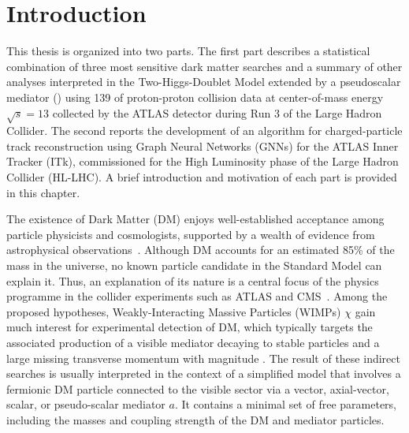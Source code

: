  \chapter{Introduction}

This thesis is organized into two parts.
The first part describes a statistical combination of three most sensitive dark matter searches and a summary of other analyses interpreted in the Two-Higgs-Doublet
Model extended by a pseudoscalar mediator (\thdma) using 139 \ifb of 
proton-proton collision data at center-of-mass energy $\sqrt{s}=13$ \TeV collected by the ATLAS detector during Run 3 of the 
Large Hadron Collider. 
The second reports the development of an algorithm for charged-particle track reconstruction using Graph Neural Networks (GNNs) for the ATLAS 
Inner Tracker (ITk), commissioned for the High Luminosity phase of the Large Hadron Collider (HL-LHC).
A brief introduction and motivation of each part is provided in this chapter.

The existence of Dark Matter (DM) enjoys well-established acceptance among particle physicists and cosmologists, supported by a 
wealth of evidence from astrophysical observations~\cite{Corbelli:1999af,Rubin:1980,Begemann:1991,Hinshaw:2012aka,Akrami:2018vks,Trimble1987,Bertone2005,Feng2010}. 
Although DM accounts for an estimated 85\% of the mass in the universe, no known particle candidate in the Standard Model can explain it.
Thus, an explanation of its nature is a central focus of the physics programme in the collider experiments such as ATLAS and CMS~\cite{adan2023darkmattersearchescms}. 
Among the proposed hypotheses, Weakly-Interacting Massive Particles \cite{Steigman:1984ac} (WIMPs) $\chi$ gain much interest for experimental detection of DM, which typically targets the associated production of a visible mediator decaying to stable particles and a large missing transverse momentum with magnitude \met.
The result of these indirect searches is usually interpreted in the context of a simplified model that involves a fermionic DM particle connected to the visible sector via a vector, axial-vector, scalar, or pseudo-scalar mediator $a$. 
It contains a minimal set of free parameters, including the masses and coupling strength of the DM and mediator particles. 

